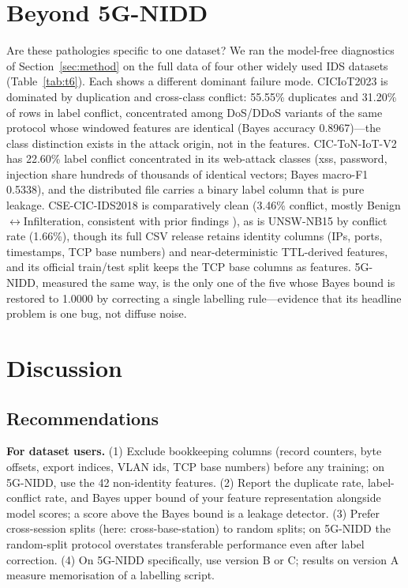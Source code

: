 \documentclass[preprint,12pt]{elsarticle}
\begin{document}
\section{Beyond 5G-NIDD}
\label{sec:beyond}

Are these pathologies specific to one dataset? We ran the model-free
diagnostics of Section~\ref{sec:method} on the full data of four other widely
used IDS datasets (Table~\ref{tab:t6}). Each shows a different dominant
failure mode. CICIoT2023 is dominated by duplication and cross-class
conflict: 55.55\% duplicates and 31.20\% of rows in label conflict,
concentrated among DoS/DDoS variants of the same protocol whose windowed
features are identical (Bayes accuracy 0.8967)---the class distinction exists
in the attack origin, not in the features. CIC-ToN-IoT-V2 has 22.60\% label
conflict concentrated in its web-attack classes (xss, password, injection
share hundreds of thousands of identical vectors; Bayes macro-F1 0.5338), and
the distributed file carries a binary label column that is pure leakage.
CSE-CIC-IDS2018 is comparatively clean (3.46\% conflict, mostly
Benign$\leftrightarrow$Infilteration, consistent with prior findings
\citep{liu2022_errorprevalence}), as is UNSW-NB15 by conflict rate (1.66\%),
though its full CSV release retains identity columns (IPs, ports, timestamps,
TCP base numbers) and near-deterministic TTL-derived features, and its official
train/test split keeps the TCP base columns as features. 5G-NIDD, measured the
same way, is the only one of the five whose Bayes bound is restored to 1.0000
by correcting a single labelling rule---evidence that its headline problem is
one bug, not diffuse noise.

\begin{table}[t]
\centering
\caption{Model-free scan of five IDS datasets (full data, non-identity
features): duplicate rate, label-conflict rate, and Bayes-style upper bounds.}
\label{tab:t6}
\small
\setlength{\tabcolsep}{4pt}

\end{table}

\section{Discussion}
\label{sec:discussion}

\subsection{Recommendations}

\textbf{For dataset users.} (1) Exclude bookkeeping columns (record counters,
byte offsets, export indices, VLAN ids, TCP base numbers) before any
training; on 5G-NIDD, use the 42 non-identity features. (2) Report the
duplicate rate, label-conflict rate, and Bayes upper bound of your feature
representation alongside model scores; a score above the Bayes bound is a
leakage detector. (3) Prefer cross-session splits (here: cross-base-station)
to random splits; on 5G-NIDD the random-split protocol overstates
transferable performance even after label correction. (4) On 5G-NIDD
specifically, use version B or C; results on version A measure memorisation of
a labelling script.
\end{document}
